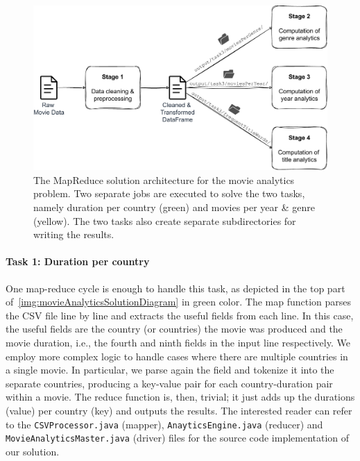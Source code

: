 \documentclass[acmlarge]{acmart}
\begin{document}
\begin{figure}[tb!]
  \centering
  \includegraphics[width=0.8\linewidth]{figures/movieAnalytics}
  \caption{The MapReduce solution architecture for the movie analytics problem. Two separate jobs are executed to solve the two tasks, namely duration per country (green) and movies per year \& genre (yellow). The two tasks also create separate subdirectories for writing the results.}
  \label{img:movieAnalyticsSolutionDiagram}
\end{figure}

\paragraph{Task 1: Duration per country} One map-reduce cycle is enough to handle this task, as depicted in the top part of~\autoref{img:movieAnalyticsSolutionDiagram} in green color. The map function parses the CSV file line by line and extracts the useful fields from each line. In this case, the useful fields are the country (or countries) the movie was produced and the movie duration, i.e., the fourth and ninth fields in the input line respectively. We employ more complex logic to handle cases where there are multiple countries in a single movie. In particular, we parse again the field and tokenize it into the separate countries, producing a key-value pair for each country-duration pair within a movie. The reduce function is, then, trivial; it just adds up the durations (value) per country (key) and outputs the results. The interested reader can refer to the \texttt{CSVProcessor.java} (mapper), \texttt{AnayticsEngine.java} (reducer) and \texttt{MovieAnalyticsMaster.java} (driver) files for the source code implementation of our solution.
\end{document}
